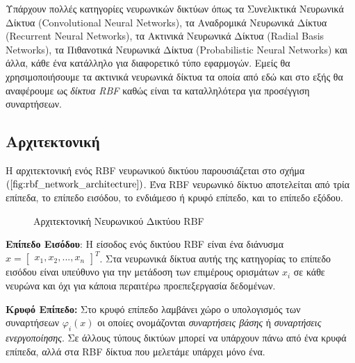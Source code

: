 Υπάρχουν πολλές κατηγορίες νευρωνικών δικτύων όπως τα Συνελικτικά Νευρωνικά Δίκτυα (Convolutional Neural Networks), τα Αναδρομικά Νευρωνικά Δίκτυα (Recurrent Neural Networks), τα Ακτινικά Νευρωνικά Δίκτυα (Radial Basis Networks), τα Πιθανοτικά Νευρωνικά Δίκτυα (Probabilistic Neural Networks) και άλλα, κάθε ένα κατάλληλο για διαφορετικό τύπο εφαρμογών. Εμείς θα χρησιμοποιήσουμε τα ακτινικά νευρωνικά δίκτυα τα οποία από εδώ και στο εξής θα αναφέρουμε ως \textit{δίκτυα RBF} καθώς είναι τα καταλληλότερα για προσέγγιση συναρτήσεων.

\subsection{Αρχιτεκτονική}
Η αρχιτεκτονική ενός RBF νευρωνικού δικτύου παρουσιάζεται στο σχήμα $(\ref{fig:rbf_network_architecture})$. Ένα RBF νευρωνικό δίκτυο αποτελείται από τρία επίπεδα, το επίπεδο εισόδου, το ενδιάμεσο ή κρυφό επίπεδο, και το επίπεδο εξόδου.

\begin{figure}
	\centering
	
	\caption{ Αρχιτεκτονική Νευρωνικού Δικτύου RBF }
	\label{fig:rbf_network_architecture}
\end{figure}

\textbf{Επίπεδο Εισόδου}: Η είσοδος ενός δικτύου RBF είναι ένα διάνυσμα $x = \begin{bmatrix} x_1,x_2, ..., x_n \end{bmatrix}^T$. Στα νευρωνικά δίκτυα αυτής της κατηγορίας το επίπεδο εισόδου είναι υπεύθυνο για την μετάδοση των επιμέρους ορισμάτων $x_i$ σε κάθε νευρώνα και όχι για κάποια περαιτέρω προεπεξεργασία δεδομένων.

\textbf{Κρυφό Επίπεδο:} Στο κρυφό επίπεδο λαμβάνει χώρο ο υπολογισμός των συναρτήσεων $\varphi_i(x)$ οι οποίες ονομάζονται \textit{συναρτήσεις βάσης} ή \textit{συναρτήσεις ενεργοποίησης}. Σε άλλους τύπους δικτύων μπορεί να υπάρχουν πάνω από ένα κρυφά επίπεδα, αλλά στα RBF δίκτυα που μελετάμε υπάρχει μόνο ένα.

